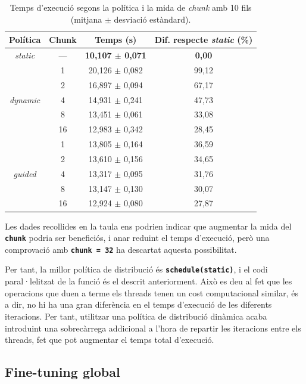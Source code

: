 \documentclass{article}
\begin{document}
\begin{table}[H]
\centering
\begin{tabular}{|c|c|c|c|}
\hline
\textbf{Política} & \textbf{Chunk} & \textbf{Temps (s)} & \textbf{Dif. respecte \textit{static} (\%)} \\ \hline
\multirow{1}{*}{\textit{static}} & --- & \textbf{10,107 $\pm$ 0,071} & \textbf{0,00} \\ \hline
\multirow{5}{*}{\textit{dynamic}} & 1 & 20,126 $\pm$ 0,082 & 99,12 \\ \cline{2-4}
 & 2 & 16,897 $\pm$ 0,094 & 67,17 \\ \cline{2-4}
 & 4 & 14,931 $\pm$ 0,241 & 47,73 \\ \cline{2-4}
 & 8 & 13,451 $\pm$ 0,061 & 33,08 \\ \cline{2-4}
 & 16 & 12,983 $\pm$ 0,342 & 28,45 \\ \hline
\multirow{5}{*}{\textit{guided}} & 1 & 13,805 $\pm$ 0,164 & 36,59 \\ \cline{2-4}
 & 2 & 13,610 $\pm$ 0,156 & 34,65 \\ \cline{2-4}
 & 4 & 13,317 $\pm$ 0,095 & 31,76 \\ \cline{2-4}
 & 8 & 13,147 $\pm$ 0,130 & 30,07 \\ \cline{2-4}
 & 16 & 12,924 $\pm$ 0,080 & 27,87 \\ \hline
\end{tabular}
\caption{Temps d'execució segons la política i la mida de \textit{chunk} amb 10 fils (mitjana $\pm$ desviació estàndard).}
\label{tab:politiques2}
\end{table}

Les dades recollides en la taula ens podrien indicar que augmentar la mida del \textbf{\texttt{chunk}} podria ser beneficiós, i anar reduint el temps d'execució, però una comprovació amb \textbf{\texttt{chunk = 32}} ha descartat aquesta possibilitat.

\noindent Per tant, la millor política de distribució és \textbf{\texttt{schedule(static)}}, i el codi paral·lelitzat de la funció és el descrit anteriorment. Això es deu al fet que les operacions que duen a terme els threads tenen un cost computacional similar, és a dir, no hi ha una gran diferència en el temps d'execució de les diferents iteracions. Per tant, utilitzar una política de distribució dinàmica acaba introduint una sobrecàrrega addicional a l'hora de repartir les iteracions entre els threads, fet que pot augmentar el temps total d'execució.
 

\subsection{Fine-tuning global}
\end{document}
